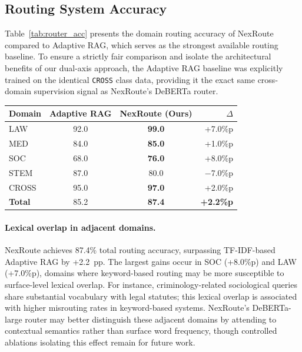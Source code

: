 \documentclass[a4paper,fleql]{cas-sc}
\begin{document}
\subsection{Routing System Accuracy}
\label{ssec:router}
Table~\ref{tab:router_acc} presents the domain routing accuracy of NexRoute
compared to Adaptive RAG, which serves as the strongest available routing
baseline. To ensure a strictly fair comparison and isolate the architectural
benefits of our dual-axis approach, the Adaptive RAG baseline was explicitly
trained on the identical \texttt{CROSS} class data, providing it the exact
same cross-domain supervision signal as NexRoute's DeBERTa router.

\vspace{6pt plus 4pt minus 3pt}
\begin{center}
\begingroup
{}
\label{tab:router_acc}
\begin{tabular}{lccr}
\toprule
\textbf{Domain} & \textbf{Adaptive RAG} & \textbf{NexRoute (Ours)} & \textbf{$\Delta$} \\
\midrule
LAW              & 92.0 & \textbf{99.0} & +7.0\%p \\
MED              & 84.0 & \textbf{85.0}  & +1.0\%p \\
SOC              & 68.0 & \textbf{76.0}  & +8.0\%p \\
STEM             & 87.0 & 80.0           & $-$7.0\%p \\
\midrule
CROSS            & 95.0 & \textbf{97.0}  & +2.0\%p \\
\midrule
\textbf{Total}   & 85.2 & \textbf{87.4}  & \textbf{+2.2\%p} \\
\bottomrule
\end{tabular}
\endgroup
\end{center}
\vspace{6pt plus 4pt minus 3pt}

\paragraph{Lexical overlap in adjacent domains.}
NexRoute achieves 87.4\% total routing accuracy, surpassing TF-IDF-based
Adaptive RAG by +2.2~pp. The largest gains occur in SOC (+8.0\%p) and LAW
(+7.0\%p), domains where keyword-based routing may be more susceptible to
surface-level lexical overlap. For instance, criminology-related sociological
queries share substantial vocabulary with legal statutes; this lexical
overlap is associated with higher misrouting rates in keyword-based systems.
NexRoute's DeBERTa-large router may better distinguish these adjacent domains
by attending to contextual semantics rather than surface word frequency,
though controlled ablations isolating this effect remain for future work.
\end{document}
